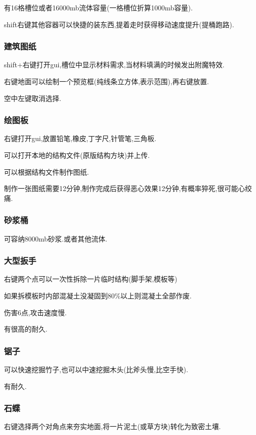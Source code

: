 {{{      有16格槽位或者16000mb流体容量(一格槽位折算1000mb容量).

      shift右键其他容器可以快捷的装东西,提着走时获得移动速度提升(提桶跑路).
    }

    \subsubsection{建筑图纸}{
      shift+右键打开gui,槽位中显示材料需求,当材料填满的时候发出附魔特效.

      右键地面可以绘制一个预览框(纯线条立方体,表示范围),再右键放置.

      空中左键取消选择.
    }

    \subsubsection{绘图板}{
      右键打开gui,放置铅笔,橡皮,丁字尺,针管笔,三角板.

      可以打开本地的结构文件(原版结构方块)并上传.

      可以根据结构文件制作图纸.

      制作一张图纸需要12分钟,制作完成后获得恶心效果12分钟,有概率猝死,很可能心绞痛.
    }

    \subsubsection{砂浆桶}{
      可容纳8000mb砂浆.或者其他流体.
    }

    \subsubsection{大型扳手}{
      右键两个点可以一次性拆除一片临时结构(脚手架,模板等)

      如果拆模板时内部混凝土没凝固到$80\%$以上则混凝土全部作废.

      伤害6点,攻击速度慢.

      有很高的耐久.
    }

    \subsubsection{锯子}{
      可以快速挖掘竹子,也可以中速挖掘木头(比斧头慢,比空手快).

      有耐久.
    }

    \subsubsection{石蝶}{
      右键选择两个对角点来夯实地面,将一片泥土(或草方块)转化为致密土壤.

}}}
